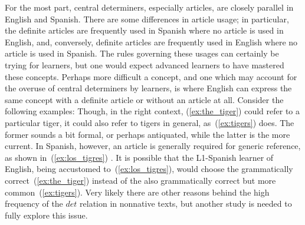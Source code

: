 \documentclass[main.tex]{subfiles}
\begin{document}
For the most part, central determiners, especially articles, are closely parallel in English and Spanish. There are some differences in article usage; in particular, the definite articles are frequently used in Spanish where no article is used in English, and, conversely, definite articles are frequently used in English where no article is used in Spanish. The rules governing these usages can certainly be trying for learners, but one would expect advanced learners to have mastered these concepts. Perhaps more difficult a concept, and one which may account for the overuse of central determiners by learners, is where English can express the same concept with a definite article or without an article at all. Consider the following examples:
Though, in the right context, (\ref{ex:the_tiger}) could refer to a particular tiger, it could also refer to tigers in general, as~(\ref{ex:tigers}) does. The former sounds a bit formal, or perhaps antiquated, while the latter is the more current. In Spanish, however, an article is generally required for generic reference, as shown in~(\ref{ex:los_tigres}) \citep[p. 157]{whitley:1986}. It is possible that the L1-Spanish learner of English, being accustomed to~(\ref{ex:los_tigres}), would choose the grammatically correct~(\ref{ex:the_tiger}) instead of the also grammatically correct but more common~(\ref{ex:tigers}). Very likely there are other reasons behind the high frequency of the $det$ relation in nonnative texts, but another study is needed to fully explore this issue.
\end{document}
